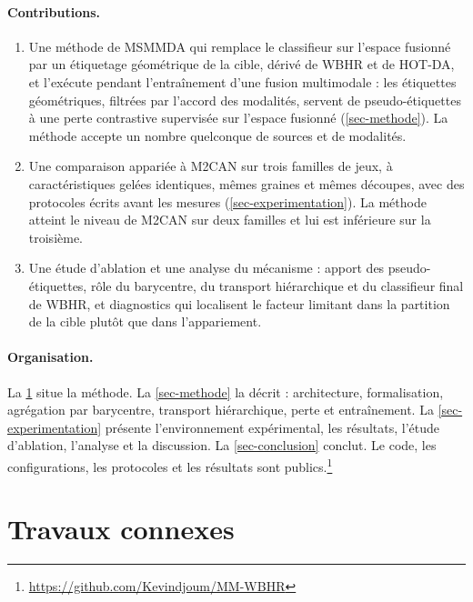 \documentclass[11pt,a4paper]{article}
\theoremstyle{definition}
\theoremstyle{remark}
\begin{document}
\paragraph{Contributions.}
\begin{enumerate}
  \item Une méthode de MSMMDA qui remplace le classifieur sur l'espace fusionné par un étiquetage géométrique de la
    cible, dérivé de WBHR et de HOT-DA, et l'exécute pendant l'entraînement d'une fusion multimodale : les étiquettes
    géométriques, filtrées par l'accord des modalités, servent de pseudo-étiquettes à une perte contrastive supervisée
    sur l'espace fusionné (\cref{sec-methode}). La méthode accepte un nombre quelconque de sources et de modalités.
  \item Une comparaison appariée à M2CAN sur trois familles de jeux, à caractéristiques gelées identiques, mêmes
    graines et mêmes découpes, avec des protocoles écrits avant les mesures (\cref{sec-experimentation}). La méthode
    atteint le niveau de M2CAN sur deux familles et lui est inférieure sur la troisième.
  \item Une étude d'ablation et une analyse du mécanisme : apport des pseudo-étiquettes, rôle du barycentre, du
    transport hiérarchique et du classifieur final de WBHR, et diagnostics qui localisent le facteur limitant dans la
    partition de la cible plutôt que dans l'appariement.
\end{enumerate}

\paragraph{Organisation.}
La \cref{sec-connexes} situe la méthode. La \cref{sec-methode} la décrit : architecture, formalisation, agrégation par
barycentre, transport hiérarchique, perte et entraînement. La \cref{sec-experimentation} présente l'environnement
expérimental, les résultats, l'étude d'ablation, l'analyse et la discussion. La \cref{sec-conclusion} conclut. Le code,
les configurations, les protocoles et les résultats sont publics.\footnote{\url{https://github.com/Kevindjoum/MM-WBHR}}

\section{Travaux connexes}\label{sec-connexes}
\end{document}

